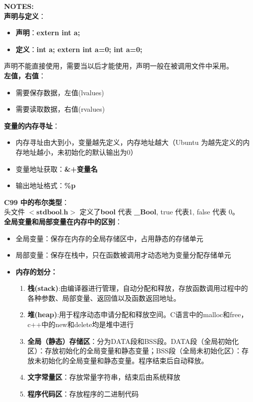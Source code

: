 \documentclass[UTF8]{ctexart}
\begin{document}
	\begin{framed}
		\textbf{NOTES:}\\ \textbf{声明与定义}：\begin{itemize}
			\item \textbf{声明}：\textbf{extern int a;} 
			\item \textbf{定义}：\textbf{int a; extern int a=0; int a=0;}
		\end{itemize} 
		声明不能直接使用，需要当以后才能使用，声明一般在被调用文件中采用。\\
		\textbf{左值，右值}：\begin{itemize}
			\item 需要保存数据，左值(lvalues)
			\item 需要读取数据，右值(rvalues)
		\end{itemize}
		\textbf{变量的内存寻址}：\begin{itemize}
			\item 内存寻址由大到小，变量越先定义，内存地址越大（Ubuntu 为越先定义的内存地址越小，未初始化的默认输出为0）
			\item 变量地址获取：\textbf{\&+变量名}
			\item 输出地址格式：\textbf{\%p}
		\end{itemize}
		\textbf{C99 中的布尔类型}：\\头文件 $<\textbf{stdbool.h}>$ 定义了\textbf{bool} 代表 \textbf{\_Bool}, true 代表1, false 代表 0。\\
		\textbf{全局变量和局部变量在内存中的区别}：\begin{itemize}
			\item 全局变量：保存在内存的全局存储区中，占用静态的存储单元
			\item 局部变量：保存在栈中，只在函数被调用才动态地为变量分配存储单元
			\item \textbf{内存的划分：}\begin{enumerate}
				\item \textbf{栈(stack)}:由编译器进行管理，自动分配和释放，存放函数调用过程中的各种参数、局部变量、返回值以及函数返回地址。
				\item \textbf{堆(heap)}:用于程序动态申请分配和释放空间。C语言中的malloc和free，c++中的new和delete均是堆中进行
				\item \textbf{全局（静态）存储区}：分为DATA段和BSS段。DATA段（全局初始化区）：存放初始化的全局变量和静态变量；BSS段（全局未初始化区）：存放未初始化的全局变量和静态变量。程序结束后自动释放。
				\item \textbf{文字常量区}：存放常量字符串，结束后由系统释放
				\item \textbf{程序代码区}：存放程序的二进制代码
			\end{enumerate}
		\end{itemize}
	\end{framed}
	
\end{document}
